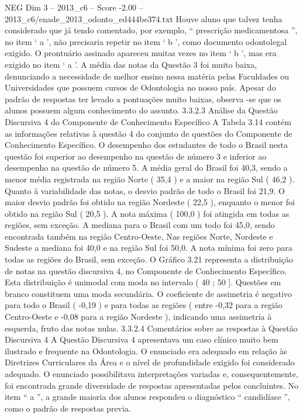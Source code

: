 \begin{textsample}{NEG Dim 3 – 2013\_c6 – Score -2.00 – 2013\_c6/enade\_2013\_odonto\_ed444be374.txt}
Houve aluno que talvez tenha considerado que já tendo comentado, por exemplo, “ prescrição medicamentosa ”, no item ‘ a ’, não precisaria repetir no item ‘ b ’, como documento odontolegal exigido.
O prontuário assinado apareceu muitas vezes no item ‘ b ’, mas era exigido no item ‘ a ’.
A média das notas da Questão 3 foi muito baixa, denunciando a necessidade de melhor ensino nessa matéria pelas Faculdades ou Universidades que possuem cursos de Odontologia no nosso país.
Apesar do padrão de respostas ter levado a pontuações muito baixas, observa -se que os alunos possuem algum conhecimento do assunto. 3.3.2.3 Análise da Questão Discursiva 4 do Componente de Conhecimento Específico A Tabela 3.14 contém as informações relativas à questão 4 do conjunto de questões do Componente de Conhecimento Específico.
O desempenho dos estudantes de todo o Brasil nesta questão foi superior ao desempenho na questão de número 3 e inferior ao desempenho na questão de número 5.
A média geral do Brasil foi 40,3, sendo a menor média registrada na região Norte ( 35,4 ) e a maior na região Sul ( 46,2 ).
Quanto à variabilidade das notas, o desvio padrão de todo o Brasil foi 21,9.
O maior desvio padrão foi obtido na região Nordeste ( 22,5 ), enquanto o menor foi obtido na região Sul ( 20,5 ).
A nota máxima ( 100,0 ) foi atingida em todas as regiões, sem exceção.
A mediana para o Brasil com um todo foi 45,0, sendo encontrada também na região Centro-Oeste, Nas regiões Norte, Nordeste e Sudeste a mediana foi 40,0 e na região Sul foi 50,0.
A nota mínima foi zero para todas as regiões do Brasil, sem exceção.
O Gráfico 3.21 representa a distribuição de notas na questão discursiva 4, no Componente de Conhecimento Específico.
Esta distribuição é unimodal com moda no intervalo ( 40 ; 50 ].
Questões em branco constituem uma moda secundária.
O coeficiente de assimetria é negativo para todo o Brasil ( -0,19 ) e para todas as regiões ( entre -0,32 para a região Centro-Oeste e -0,08 para a região Nordeste ), indicando uma assimetria à esquerda, fruto das notas nulas. 3.3.2.4 Comentários sobre as respostas à Questão Discursiva 4 A Questão Discursiva 4 apresentava um caso clínico muito bem ilustrado e frequente na Odontologia.
O enunciado era adequado em relação às Diretrizes Curriculares da Área e o nível de profundidade exigido foi considerado adequado.
O enunciado possibilitava interpretações variadas e, consequentemente, foi encontrada grande diversidade de respostas apresentadas pelos concluintes.
No item “ a ”, a grande maioria dos alunos respondeu o diagnóstico “ candidíase ”, como o padrão de respostas previa.

\end{textsample}
